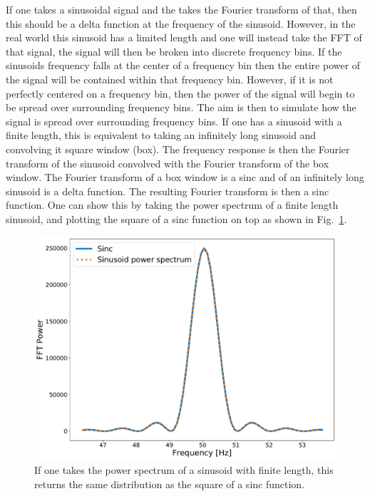 If one takes a sinusoidal signal and the takes the Fourier transform of that, then this should be a delta function at the frequency of the sinusoid. 
However, in the real world this sinusoid has a limited length and one will instead take the \gls{FFT} of that signal, the signal will then be broken into discrete frequency bins.
If the sinusoids frequency falls at the center of a frequency bin then the entire power of the signal will be contained within that frequency bin.
However, if it is not perfectly centered on a frequency bin, then the power of the signal will begin to be spread over surrounding frequency bins. 
The aim is then to simulate how the signal is spread over surrounding frequency bins.
If one has a sinusoid with a finite length, this is equivalent to taking an infinitely long sinusoid and convolving it square window (box). 
The frequency response is then the Fourier transform of the sinusoid convolved with the Fourier transform of the box window.
The Fourier transform of a box window is a sinc and of an infinitely long sinusoid is a delta function. 
The resulting Fourier transform is then a sinc function.
One can show this by taking the power spectrum of a finite length sinusoid, and plotting the square of a sinc function on top as shown in Fig.~\ref{app1:sin:sinc}.

\begin{figure}
	\centering
	\includegraphics[width=0.7\linewidth]{AppendixA/sinc_fft.pdf}
	\caption[Sinc function compared to \gls{FFT} of finite length sinusoid.]{If one takes the power spectrum of a sinusoid with finite length, this returns the same distribution as the square of a sinc function.}
	\label{app1:sin:sinc}
\end{figure}

